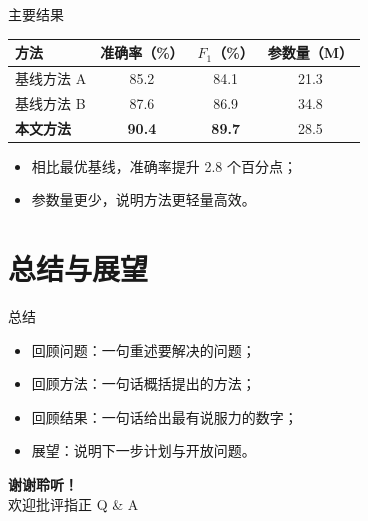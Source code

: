 \begin{frame}{主要结果}
  \begin{table}
    \centering
    \begin{tabular}{lccc}
      \toprule
      方法 & 准确率（\%） & $F_1$（\%） & 参数量（M） \\
      \midrule
      基线方法 A & 85.2 & 84.1 & 21.3 \\
      基线方法 B & 87.6 & 86.9 & 34.8 \\
      \textbf{本文方法} & \textbf{90.4} & \textbf{89.7} & 28.5 \\
      \bottomrule
    \end{tabular}
  \end{table}
  \begin{itemize}
    \item 相比最优基线，准确率提升 \alert{2.8 个百分点}；
    \item 参数量更少，说明方法更轻量高效。
  \end{itemize}
\end{frame}

\section{总结与展望}

\begin{frame}{总结}
  \begin{itemize}
    \item 回顾问题：一句重述要解决的问题；
    \item 回顾方法：一句话概括提出的方法；
    \item 回顾结果：一句话给出最有说服力的数字；
    \item 展望：说明下一步计划与开放问题。
  \end{itemize}
\end{frame}

\begin{frame}[plain]
  \begin{center}
    \vspace{3.5em}
    {\color{maincolor}\Huge\bfseries 谢谢聆听！}\\[1.2em]
    {\large \color{graytext} 欢迎批评指正 \quad Q \& A}
  \end{center}
\end{frame}


